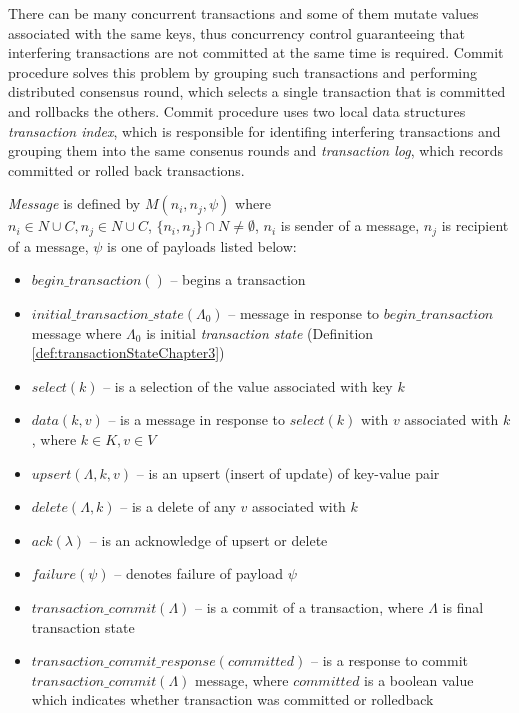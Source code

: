 There can be many concurrent transactions and some of them mutate values associated with the same keys, thus concurrency control guaranteeing that interfering transactions are not committed at the same time is required. Commit procedure solves this problem by grouping such transactions and performing distributed consensus round, which selects a single transaction that is committed and rollbacks the others.
Commit procedure uses two local data structures \emph{transaction index}, which is responsible for identifing interfering transactions and grouping them into the same consenus rounds and \emph{transaction log}, which records committed or rolled back transactions.

\begin{definition}
	\label{def:message}
	\emph{Message} is defined by $\mathit{M}(n_{i}, n_{j}, \psi)$ where 
	\\ $n_{i}\in\mathit{N}\cup\mathit{C}, n_{j}\in\mathit{N}\cup\mathit{C}$, $\{n_{i}, n_{j}\}\cap\mathit{N}\neq\emptyset$, $n_{i}$ is sender of a message, $n_{j}$ is recipient of a message, $\psi$ is one of payloads listed below:
	\begin{itemize}	
	\item $\mathit{begin\_transaction}()$ -- begins a transaction 
	\item $\mathit{initial\_transaction\_state}(\Lambda_0)$ -- message in response to $\mathit{begin\_transaction}$ message where $\Lambda_0$ is initial \emph{transaction state} (Definition \ref{def:transactionStateChapter3}) 
	\item $\mathit{select(k)}$ -- is a selection of the value associated with key $k$
	\item $\mathit{data(k,v)}$ -- is a message in response to $\mathit{select(k)}$ with $v$ associated with $k$, where $k\in\mathit{K}, v\in\mathit{V}$ 
	\item $\mathit{upsert}(\Lambda,k,v)$ -- is an upsert (insert of update) of key-value pair 
	\item $\mathit{delete}(\Lambda,k)$ -- is a delete of any $v$ associated with $k$
	\item $\mathit{ack}(\lambda)$ -- is an acknowledge of upsert or delete
	\item $\mathit{failure}(\psi)$ -- denotes failure of payload $\psi$
	\item $\mathit{transaction\_commit}(\Lambda)$ -- is a commit of a transaction, where $\Lambda$ is final transaction state 
	\item $\mathit{transaction\_commit\_response}(committed)$ -- is a response to commit $\mathit{transaction\_commit}(\Lambda)$ message, where $committed$ is a boolean value which indicates whether transaction was committed or rolledback

\end{itemize}
\end{definition}
